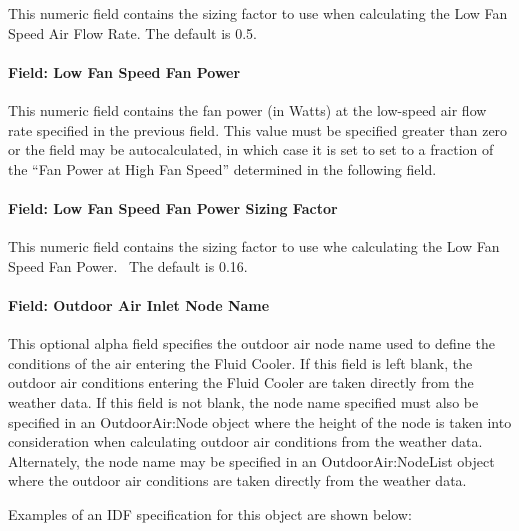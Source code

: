 This numeric field contains the sizing factor to use when calculating the Low Fan Speed Air Flow Rate. The default is 0.5.

\paragraph{Field: Low Fan Speed Fan Power}\label{field-low-fan-speed-fan-power-2}

This numeric field contains the fan power (in Watts) at the low-speed air flow rate specified in the previous field. This value must be specified greater than zero or the field may be autocalculated, in which case it is set to set to a fraction of the ``Fan Power at High Fan Speed'' determined in the following field.

\paragraph{Field: Low Fan Speed Fan Power Sizing Factor}\label{field-low-fan-speed-fan-power-sizing-factor-2}

This numeric field contains the sizing factor to use whe calculating the Low Fan Speed Fan Power.~ The default is 0.16.

\paragraph{Field: Outdoor Air Inlet Node Name}\label{field-outdoor-air-inlet-node-name-7}

This optional alpha field specifies the outdoor air node name used to define the conditions of the air entering the Fluid Cooler. If this field is left blank, the outdoor air conditions entering the Fluid Cooler are taken directly from the weather data. If this field is not blank, the node name specified must also be specified in an OutdoorAir:Node object where the height of the node is taken into consideration when calculating outdoor air conditions from the weather data. Alternately, the node name may be specified in an OutdoorAir:NodeList object where the outdoor air conditions are taken directly from the weather data.

Examples of an IDF specification for this object are shown below:

